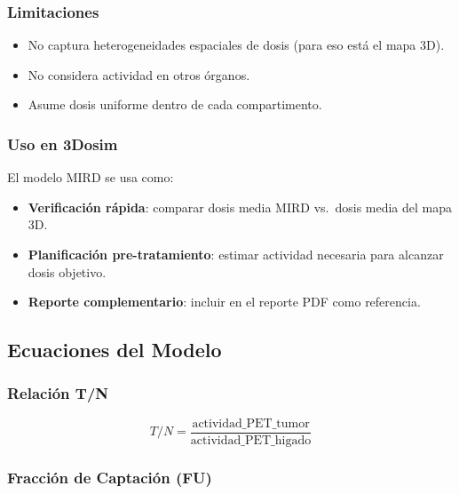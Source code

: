 \documentclass[12pt,a4paper]{article}
\begin{document}
\subsubsection{Limitaciones}

\begin{itemize}
  \item No captura heterogeneidades espaciales de dosis (para eso está el mapa 3D).
  \item No considera actividad en otros órganos.
  \item Asume dosis uniforme dentro de cada compartimento.
\end{itemize}

\subsubsection{Uso en 3Dosim}

El modelo MIRD se usa como:
\begin{itemize}
  \item \textbf{Verificación rápida}: comparar dosis media MIRD vs.\ dosis media del mapa 3D.
  \item \textbf{Planificación pre-tratamiento}: estimar actividad necesaria para alcanzar dosis objetivo.
  \item \textbf{Reporte complementario}: incluir en el reporte PDF como referencia.
\end{itemize}

\subsection{Ecuaciones del Modelo}

\subsubsection{Relación T/N}

$$T/N = \frac{\text{actividad\_PET\_tumor}}{\text{actividad\_PET\_higado}}$$


\subsubsection{Fracción de Captación (FU)}
\end{document}
